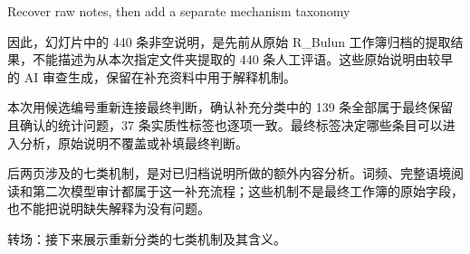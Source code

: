 \documentclass[10pt,aspectratio=169]{beamer}
\begin{document}
\begin{frame}[t]{Recover raw notes, then add a separate mechanism taxonomy}
{\par
因此，幻灯片中的 440 条非空说明，是先前从原始 R\_Bulun 工作簿归档的提取结果，不能描述为从本次指定文件夹提取的 440 条人工评语。这些原始说明由较早的 AI 审查生成，保留在补充资料中用于解释机制。
\par
本次用候选编号重新连接最终判断，确认补充分类中的 139 条全部属于最终保留且确认的统计问题，37 条实质性标签也逐项一致。最终标签决定哪些条目可以进入分析，原始说明不覆盖或补填最终判断。
\par
后两页涉及的七类机制，是对已归档说明所做的额外内容分析。词频、完整语境阅读和第二次模型审计都属于这一补充流程；这些机制不是最终工作簿的原始字段，也不能把说明缺失解释为没有问题。
\par
转场：接下来展示重新分类的七类机制及其含义。
}
\end{frame}
\end{document}
